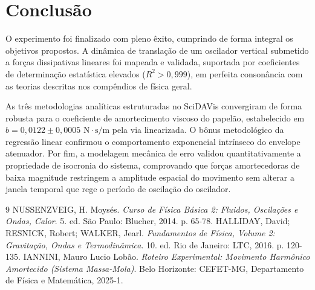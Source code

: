 \documentclass[12pt, a4paper]{article}
\begin{document}
\section{Conclusão}

O experimento foi finalizado com pleno êxito, cumprindo de forma integral os objetivos propostos. A dinâmica de translação de um oscilador vertical submetido a forças dissipativas lineares foi mapeada e validada, suportada por coeficientes de determinação estatística elevados ($R^2 > 0,999$), em perfeita consonância com as teorias descritas nos compêndios de física geral.

As três metodologias analíticas estruturadas no SciDAVis convergiram de forma robusta para o coeficiente de amortecimento viscoso do papelão, estabelecido em $b = 0,0122 \pm 0,0005 \text{ N}\cdot\text{s/m}$ pela via linearizada. O bônus metodológico da regressão linear confirmou o comportamento exponencial intrínseco do envelope atenuador. Por fim, a modelagem mecânica de erro validou quantitativamente a propriedade de isocronia do sistema, comprovando que forças amortecedoras de baixa magnitude restringem a amplitude espacial do movimento sem alterar a janela temporal que rege o período de oscilação do oscilador.

\newpage
\begin{thebibliography}{9}
     NUSSENZVEIG, H. Moysés. \textit{Curso de Física Básica 2: Fluidos, Oscilações e Ondas, Calor}. 5. ed. São Paulo: Blucher, 2014. p. 65-78.
     HALLIDAY, David; RESNICK, Robert; WALKER, Jearl. \textit{Fundamentos de Física, Volume 2: Gravitação, Ondas e Termodinâmica}. 10. ed. Rio de Janeiro: LTC, 2016. p. 120-135.
     IANNINI, Mauro Lucio Lobão. \textit{Roteiro Experimental: Movimento Harmônico Amortecido (Sistema Massa-Mola)}. Belo Horizonte: CEFET-MG, Departamento de Física e Matemática, 2025-1.
\end{thebibliography}
\end{document}

